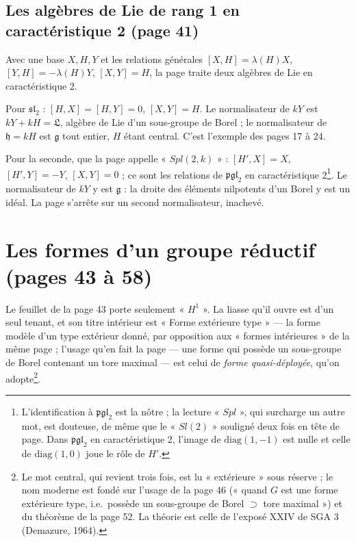 \documentclass[11pt,a4paper]{article}
\begin{document}
\subsection*{Les algèbres de Lie de rang 1 en caractéristique 2 (page 41)}

Avec une base $X, H, Y$ et les relations générales $[X,H] = \lambda(H) X$,
$[Y,H] = -\lambda(H) Y$, $[X,Y] = H$, la page traite deux algèbres de Lie en
caractéristique 2.

Pour $\mathfrak{sl}_2$ : $[H,X] = [H,Y] = 0$, $[X,Y] = H$. Le normalisateur de
$kY$ est $kY + kH = \mathfrak{L}$, algèbre de Lie d'un sous-groupe de Borel ; le
normalisateur de $\mathfrak{h} = kH$ est $\mathfrak{g}$ tout entier, $H$ étant
central. C'est l'exemple des pages 17 à 24.

Pour la seconde, que la page appelle « $Spl(2,k)$ » : $[H',X] = X$,
$[H',Y] = -Y$, $[X,Y] = 0$ ; ce sont les relations de $\mathfrak{pgl}_2$ en
caractéristique 2\footnote{L'identification à $\mathfrak{pgl}_2$ est la nôtre ;
la lecture « $Spl$ », qui surcharge un autre mot, est douteuse, de même que le
« $Sl(2)$ » souligné deux fois en tête de page. Dans $\mathfrak{pgl}_2$ en
caractéristique 2, l'image de $\mathrm{diag}(1,-1)$ est nulle et celle de
$\mathrm{diag}(1,0)$ joue le rôle de $H'$.}. Le normalisateur de $kY$ y est
$\mathfrak{g}$ : la droite des éléments nilpotents d'un Borel y est un idéal. La
page s'arrête sur un second normalisateur, inachevé.

\section*{Les formes d'un groupe réductif (pages 43 à 58)}

Le feuillet de la page 43 porte seulement « $H^1$ ». La liasse qu'il ouvre est
d'un seul tenant, et son titre intérieur est « Forme extérieure type » — la
forme modèle d'un type extérieur donné, par opposition aux « formes
intérieures » de la même page ; l'usage qu'en fait la page — une forme qui
possède un sous-groupe de Borel contenant un tore maximal — est celui de
\emph{forme quasi-déployée}, qu'on adopte\footnote{Le mot central, qui revient
trois fois, est lu « extérieure » sous réserve ; le nom moderne est fondé sur
l'usage de la page 46 (« quand $G$ est une forme extérieure type, i.e.\ possède
un sous-groupe de Borel $\supset$ tore maximal ») et du théorème de la
page 52. La théorie est celle de l'exposé XXIV de SGA 3
(Demazure, 1964).}.
\end{document}
